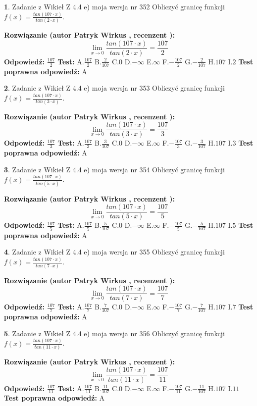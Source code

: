 \documentclass[12pt, a4paper]{article}
\theoremstyle{definition} %
\newtheorem{zad}{}
\newcommand{\zadStart}[1]{\begin{zad}#1\newline}
\newcommand{\zadStop}{\end{zad}}
\newcommand{\rozwStart}[2]{\noindent \textbf{Rozwiązanie (autor #1 , recenzent #2): }\newline}
\newcommand{\rozwStop}{\newline}
\newcommand{\odpStart}{\noindent \textbf{Odpowiedź:}\newline}
\newcommand{\odpStop}{\newline}
\newcommand{\testStart}{\noindent \textbf{Test:}\newline}
\newcommand{\testStop}{\newline}
\newcommand{\kluczStart}{\noindent \textbf{Test poprawna odpowiedź:}\newline}
\newcommand{\kluczStop}{\newline}
\begin{document}
\zadStart{Zadanie z Wikieł Z 4.4 e) moja wersja nr 352}
Obliczyć granicę funkcji $f(x)=\frac{tan(107\cdot x)}{tan(2\cdot x)}$.
\zadStop
\rozwStart{Patryk Wirkus}{}
$$\lim\limits_{x\to 0}\frac{tan(107\cdot x)}{tan(2\cdot x)}=
\frac{107}{2}$$
\rozwStop
\odpStart
$\frac{107}{2}$
\odpStop
\testStart
A.$\frac{107}{2}$
B.$\frac{2}{107}$
C.$0$
D.$-\infty$
E.$\infty$
F.$-\frac{107}{2}$
G.$-\frac{2}{107}$
H.$107$
I.$2$
\testStop
\kluczStart
A
\kluczStop



\zadStart{Zadanie z Wikieł Z 4.4 e) moja wersja nr 353}
Obliczyć granicę funkcji $f(x)=\frac{tan(107\cdot x)}{tan(3\cdot x)}$.
\zadStop
\rozwStart{Patryk Wirkus}{}
$$\lim\limits_{x\to 0}\frac{tan(107\cdot x)}{tan(3\cdot x)}=
\frac{107}{3}$$
\rozwStop
\odpStart
$\frac{107}{3}$
\odpStop
\testStart
A.$\frac{107}{3}$
B.$\frac{3}{107}$
C.$0$
D.$-\infty$
E.$\infty$
F.$-\frac{107}{3}$
G.$-\frac{3}{107}$
H.$107$
I.$3$
\testStop
\kluczStart
A
\kluczStop



\zadStart{Zadanie z Wikieł Z 4.4 e) moja wersja nr 354}
Obliczyć granicę funkcji $f(x)=\frac{tan(107\cdot x)}{tan(5\cdot x)}$.
\zadStop
\rozwStart{Patryk Wirkus}{}
$$\lim\limits_{x\to 0}\frac{tan(107\cdot x)}{tan(5\cdot x)}=
\frac{107}{5}$$
\rozwStop
\odpStart
$\frac{107}{5}$
\odpStop
\testStart
A.$\frac{107}{5}$
B.$\frac{5}{107}$
C.$0$
D.$-\infty$
E.$\infty$
F.$-\frac{107}{5}$
G.$-\frac{5}{107}$
H.$107$
I.$5$
\testStop
\kluczStart
A
\kluczStop



\zadStart{Zadanie z Wikieł Z 4.4 e) moja wersja nr 355}
Obliczyć granicę funkcji $f(x)=\frac{tan(107\cdot x)}{tan(7\cdot x)}$.
\zadStop
\rozwStart{Patryk Wirkus}{}
$$\lim\limits_{x\to 0}\frac{tan(107\cdot x)}{tan(7\cdot x)}=
\frac{107}{7}$$
\rozwStop
\odpStart
$\frac{107}{7}$
\odpStop
\testStart
A.$\frac{107}{7}$
B.$\frac{7}{107}$
C.$0$
D.$-\infty$
E.$\infty$
F.$-\frac{107}{7}$
G.$-\frac{7}{107}$
H.$107$
I.$7$
\testStop
\kluczStart
A
\kluczStop



\zadStart{Zadanie z Wikieł Z 4.4 e) moja wersja nr 356}
Obliczyć granicę funkcji $f(x)=\frac{tan(107\cdot x)}{tan(11\cdot x)}$.
\zadStop
\rozwStart{Patryk Wirkus}{}
$$\lim\limits_{x\to 0}\frac{tan(107\cdot x)}{tan(11\cdot x)}=
\frac{107}{11}$$
\rozwStop
\odpStart
$\frac{107}{11}$
\odpStop
\testStart
A.$\frac{107}{11}$
B.$\frac{11}{107}$
C.$0$
D.$-\infty$
E.$\infty$
F.$-\frac{107}{11}$
G.$-\frac{11}{107}$
H.$107$
I.$11$
\testStop
\kluczStart
A
\kluczStop
\end{document}
